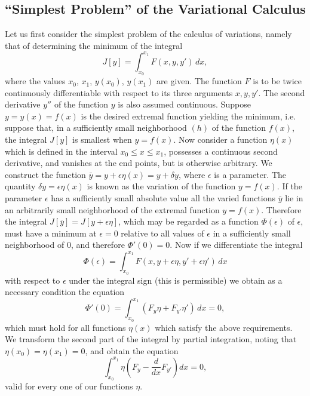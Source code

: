 \subsection{``Simplest Problem'' of the Variational Calculus}
Let us first consider the simplest problem of the calculus of variations, namely that of determining the minimum of the integral
\begin{equation}\tag{13}
J[y]=\int_{x_0}^{x_1}F(x,y,y')\,dx,
\end{equation}
where the values $x_0$, $x_1$, $y(x_0)$, $y(x_1)$ are given. The function $F$ is to be twice continuously differentiable with respect to its three arguments $x,y,y'$. The second derivative $y''$ of the function $y$ is also assumed continuous. Suppose $y=y(x)=f(x)$ is the desired extremal function yielding the minimum, i.e. suppose that, in a sufficiently small neighborhood $(h)$ of the function $f(x)$, the integral $J[y]$ is smallest when $y=f(x)$. Now consider a function $\eta(x)$ which is defined in the interval $x_0\le x\le x_1$, possesses a continuous second derivative, and vanishes at the end points, but is otherwise arbitrary. We construct the function $\bar y=y+\epsilon\eta(x)=y+\delta y$, where $\epsilon$ is a parameter. The quantity $\delta y=\epsilon\eta(x)$ is known as the variation of the function $y=f(x)$. If the parameter $\epsilon$ has a sufficiently small absolute value all the varied functions $\bar y$ lie in an arbitrarily small neighborhood of the extremal function $y=f(x)$. Therefore the integral $J[\bar y]=J[y+\epsilon\eta]$, which may be regarded as a function $\Phi(\epsilon)$ of $\epsilon$, must have a minimum at $\epsilon=0$ relative to all values of $\epsilon$ in a sufficiently small neighborhood of $0$, and therefore $\Phi'(0)=0$. Now if we differentiate the integral
\[
\Phi(\epsilon)=\int_{x_0}^{x_1}F(x,y+\epsilon\eta,y'+\epsilon\eta')\,dx
\]
with respect to $\epsilon$ under the integral sign (this is permissible) we obtain as a necessary condition the equation
\[
\Phi'(0)=\int_{x_0}^{x_1}(F_y\eta+F_{y'}\eta')\,dx=0,
\]
which must hold for all functions $\eta(x)$ which satisfy the above requirements. We transform the second part of the integral by partial integration, noting that $\eta(x_0)=\eta(x_1)=0$, and obtain the equation
\[
\int_{x_0}^{x_1}\eta\left(F_y-\frac{d}{dx}F_{y'}\right)dx=0,
\]
valid for every one of our functions $\eta$.

